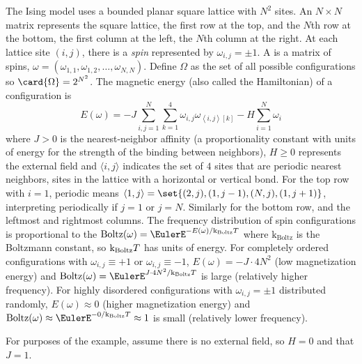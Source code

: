 \documentclass[12pt]{article}
\newcommand{\kT}{{\text k}_{\text{Boltz}}T}
\begin{document}
The Ising model uses a bounded planar square lattice with \( N^2 \)
sites.  An \( N \times N \) matrix represents the square lattice, the
first row at the top, and the \( N \)th row at the bottom, the first
column at the left, the \( N \)th column at the right.  At each lattice
site \( (i,j) \), there is a \emph{spin} represented by \( \omega_{i,j}
= \pm 1 \).  A  is a matrix of spins, \( \omega = (\omega_
{1,1}, \omega_{1,2}, \dots, \omega_{N,N}) \).%
Define \( \Omega \) as the set of all possible configurations so \(
\card{\Omega} = 2^{N^2} \).  The magnetic energy (also called the
Hamiltonian) of a configuration is
\[
    E(\omega) = -J \sum\limits_{i, j=1}^{N} \sum\limits_{k=1}^4 \omega_{i,
    j} \omega_{\left\langle i,j \right\rangle[k]} - H \sum\limits_{i=1}^N
    \omega_i
\] where \( J > 0 \) is the nearest-neighbor affinity (a proportionality
constant with units of energy for the strength of the binding between
neighbors), \( H \ge 0 \) represents the external field and \( \langle
i, j \rangle \) indicates the set of \( 4 \) sites that are periodic
nearest neighbors, sites in the lattice with a horizontal or vertical
bond.  For the top row with \( i = 1 \), periodic means \( \left\langle 1, j
\right\rangle = \set{(2,j), (1, j-1), (N,j), (1, j+1)} \), interpreting
periodically if \( j=1 \) or \( j=N \).  Similarly for the bottom row,
and the leftmost and rightmost columns.  The frequency distribution of
spin configurations is proportional to the %
\(
\operatorname{Boltz}
(\omega) = \EulerE^{-E(\omega)/\kT} \) where \( \text{k}_{\text{Boltz}} \) is the Boltzmann
constant, so \( \kT \) has units of energy.  For completely ordered
configurations with \( \omega_{i,j} \equiv +1 \) or \( \omega_{i,j}
\equiv -1 \), \( E(\omega) = -J \cdot 4N^2 \) (low magnetization energy)
and \(
\operatorname{Boltz}
(\omega) = \EulerE^{J \cdot 4N^2/\kT} \) is large (relatively higher
frequency).  For highly disordered configurations with \( \omega_{i,j} =
\pm 1 \) distributed randomly, \( E(\omega) \approx 0 \) (higher
magnetization energy) and \(
\operatorname{Boltz}
(\omega) \approx \EulerE^{-0/\kT} \approx 1 \) is small (relatively lower
frequency).

For purposes of the example, assume there is no external field, so \(
H=0 \) and that \( J=1 \).
\end{document}
